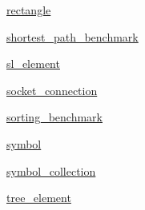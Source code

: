 \begin{DoxyCompactItemize}
 \mbox{\hyperlink{namespacebridges_1_1rectangle}{rectangle}}
\item 
 \mbox{\hyperlink{namespacebridges_1_1shortest__path__benchmark}{shortest\+\_\+path\+\_\+benchmark}}
\item 
 \mbox{\hyperlink{namespacebridges_1_1sl__element}{sl\+\_\+element}}
\item 
 \mbox{\hyperlink{namespacebridges_1_1socket__connection}{socket\+\_\+connection}}
\item 
 \mbox{\hyperlink{namespacebridges_1_1sorting__benchmark}{sorting\+\_\+benchmark}}
\item 
 \mbox{\hyperlink{namespacebridges_1_1symbol}{symbol}}
\item 
 \mbox{\hyperlink{namespacebridges_1_1symbol__collection}{symbol\+\_\+collection}}
\item 
 \mbox{\hyperlink{namespacebridges_1_1tree__element}{tree\+\_\+element}}
\end{DoxyCompactItemize}

